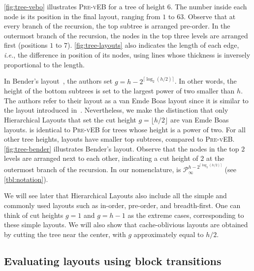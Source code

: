 \documentclass[10pt,conference,letterpaper]{IEEEtran}
\newcommand{\note}[1]{}
\newcommand{\comment}[1]{}
\newcommand{\node}{node\xspace}
\newcommand{\nodes}{nodes\xspace}
\newcommand{\vEBl}{van Emde Boas layout\xspace}
\newcommand{\vEBls}{van Emde Boas layouts\xspace}
\newcommand{\HLs}{Hierarchical Layouts\xspace}
\newcommand{\pvl}{\textsc{Pre-vEB}\xspace}
\newcommand{\PR}{\ensuremath{\mathcal{P}}\xspace}
\newcommand{\CEIL}[1]{\ensuremath{\lceil #1 \rceil}\xspace}
\newcommand{\FLOOR}[1]{\ensuremath{\lfloor #1 \rfloor}\xspace}
\newcommand{\ie}{{\it i.e.}\xspace}
\begin{document}
\autoref{fig:tree-vebo} illustrates \pvl for a tree of height $6$.
\comment{using $g = \FLOOR{h/2}$.} The number inside each \node is its position in the final layout, ranging from $1$ to $63$. 
Observe that at every branch of the recursion, the top subtree is arranged pre-order. In the outermost branch of the recursion, the \nodes in the top three levels are arranged first (positions $1$ to $7$).
\autoref{fig:tree-layouts} also indicates the length of each edge, \ie, the difference in position of its \nodes, using lines whose thickness is inversely proportional to the length. 

In Bender's layout~\cite{Bender05}, the authors set $g = h - 2^{\CEIL{\log_2(h/2)}}$. In other words, the height of the bottom subtrees is set to the largest power of two smaller than $h$. The authors refer to their layout as a \vEBl since it is similar to the layout introduced in~\cite{Prokop}. Nevertheless, we make the distinction that only \HLs that set the cut height $g=\FLOOR{h/2}$ are \vEBls. \bender is identical to \pvl for trees whose height is a power of two.
For all other tree heights, \bender layouts have smaller top subtrees, compared to \pvl. \autoref{fig:tree-bender} illustrates Bender's layout. Observe that the \nodes in the top $2$ levels are arranged next to each other, indicating a cut height of $2$ at the outermost branch of the recursion. In our nomenclature, \bender is $\PR^{h - 2^{\CEIL{\log_2(h/2)}}}_\infty$ (see \autoref{tbl:notation}).
\comment{see that \bender is in the same column as \pvl, but is not a \vEBl, and is therefore placed in its own row.}

We will see later that \HLs also include all the simple and commonly used layouts such as in-order, pre-order, and breadth-first. One can think of cut heights $g=1$ and $g=h-1$ as the extreme cases, corresponding to these simple layouts. We will also show that cache-oblivious layouts are obtained by cutting the tree near the center, with $g$ approximately equal to $h/2$. 

\note{Move next 2 paragraphs to introduction, merging it with text there. Done.}

\subsection{Evaluating layouts using block transitions}
\label{sec:blocktrans}
\end{document}

